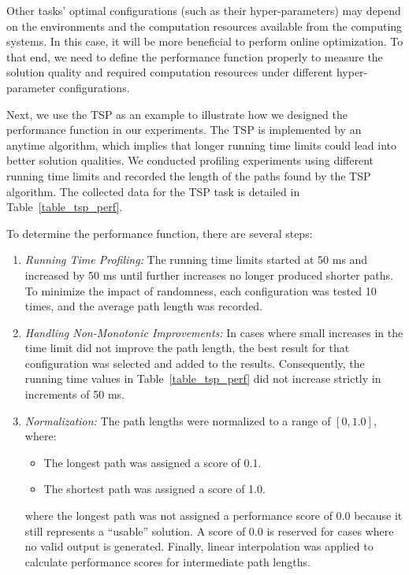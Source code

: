 Other tasks' optimal configurations (such as their hyper-parameters) may depend on the environments and the computation resources available from the computing systems.
In this case, it will be more beneficial to perform online optimization.
To that end, we need to define the performance function properly to measure the solution quality and required computation resources under different hyper-parameter configurations.

Next, we use the TSP as an example to illustrate how we designed the performance function in our experiments.
The TSP is implemented by an anytime algorithm, which implies that longer running time limits could lead into better solution qualities.
We conducted profiling experiments using different running time limits and recorded the length of the paths found by the TSP algorithm.
The collected data for the TSP task is detailed in Table~\ref{table_tsp_perf}.

To determine the performance function, there are several steps:
\begin{enumerate}
    \item \textit{Running Time Profiling:}
    The running time limits started at 50 ms and increased by 50 ms until further increases no longer produced shorter paths.
    To minimize the impact of randomness, each configuration was tested 10 times, and the average path length was recorded.

    \item \textit{Handling Non-Monotonic Improvements:}
    In cases where small increases in the time limit did not improve the path length, the best result for that configuration was selected and added to the results.
    Consequently, the running time values in Table~\ref{table_tsp_perf} did not increase strictly in increments of 50 ms.

    \item \textit{Normalization:}
    The path lengths were normalized to a range of $[0, 1.0]$, where:
    \begin{itemize}
        \item The longest path was assigned a score of 0.1.
        \item The shortest path was assigned a score of 1.0.
    \end{itemize}
    where the longest path was not assigned a performance score of 0.0 because it still represents a ``usable'' solution.
    A score of 0.0 is reserved for cases where no valid output is generated.
    Finally, linear interpolation was applied to calculate performance scores for intermediate path lengths.
\end{enumerate}

